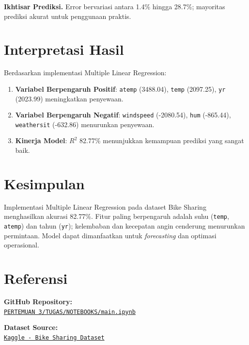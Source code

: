\documentclass[11pt,a4paper]{article}
\begin{document}
\noindent\textbf{Ikhtisar Prediksi.}
Error bervariasi antara 1{.}4\% hingga 28{.}7\%; mayoritas prediksi akurat untuk penggunaan praktis.

\section{Interpretasi Hasil}
Berdasarkan implementasi Multiple Linear Regression:
\begin{enumerate}
    \item \textbf{Variabel Berpengaruh Positif}: \texttt{atemp} (3488.04), \texttt{temp} (2097.25), \texttt{yr} (2023.99) meningkatkan penyewaan.
    \item \textbf{Variabel Berpengaruh Negatif}: \texttt{windspeed} (-2080.54), \texttt{hum} (-865.44), \texttt{weathersit} (-632.86) menurunkan penyewaan.
    \item \textbf{Kinerja Model}: $R^2$ 82{.}77\% menunjukkan kemampuan prediksi yang sangat baik.
\end{enumerate}

\section{Kesimpulan}
Implementasi Multiple Linear Regression pada dataset Bike Sharing menghasilkan akurasi 82{.}77\%.
Fitur paling berpengaruh adalah suhu (\texttt{temp}, \texttt{atemp}) dan tahun (\texttt{yr}); kelembaban dan kecepatan angin cenderung menurunkan permintaan.
Model dapat dimanfaatkan untuk \textit{forecasting} dan optimasi operasional.

\section{Referensi}
\noindent\textbf{GitHub Repository:}\\
\href{https://github.com/sttnf/machine-learning/tree/main/PERTEMUAN%203/TUGAS/NOTEBOOKS/main.ipynb}{\texttt{PERTEMUAN 3/TUGAS/NOTEBOOKS/main.ipynb}}

\vspace{4pt}
\noindent\textbf{Dataset Source:}\\
\href{https://www.kaggle.com/datasets/lakshmi25npathi/bike-sharing-dataset}{\texttt{Kaggle - Bike Sharing Dataset}}
\end{document}
